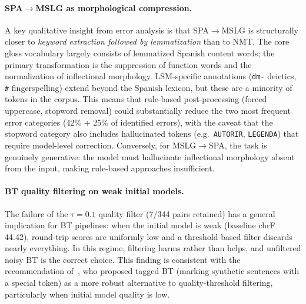 \documentclass[sigconf,screen]{ceurart}
\begin{document}
\paragraph{SPA$\!\to\!$MSLG as morphological compression.}
A key qualitative insight from error analysis is that
SPA$\!\to\!$MSLG is structurally closer to \emph{keyword extraction
followed by lemmatization} than to NMT.
The core gloss vocabulary largely consists of lemmatized Spanish
content words; the primary transformation is the suppression of
function words and the normalization of inflectional morphology.
LSM-specific annotations (\texttt{dm-} deictics, \texttt{\#}
fingerspelling) extend beyond the Spanish lexicon, but these are
a minority of tokens in the corpus.
This means that rule-based post-processing (forced uppercase, stopword
removal) could substantially reduce the two most frequent error
categories (42\% + 25\% of identified errors), with the caveat that
the stopword category also includes hallucinated tokens (e.g.\
\texttt{AUTORIR}, \texttt{LEGENDA}) that require model-level correction.
Conversely, for MSLG$\!\to\!$SPA, the task is genuinely generative:
the model must hallucinate inflectional morphology absent from the
input, making rule-based approaches insufficient.

\paragraph{BT quality filtering on weak initial models.}
The failure of the $\tau = 0.1$ quality filter (7/344 pairs retained)
has a general implication for BT pipelines: when the initial model is
weak (baseline chrF 44.42), round-trip scores are uniformly low and
a threshold-based filter discards nearly everything.
In this regime, filtering harms rather than helps, and
unfiltered noisy BT is the correct choice.
This finding is consistent with the recommendation
of~\cite{caswell2019tagged}, who proposed tagged BT (marking synthetic
sentences with a special token) as a more robust alternative to
quality-threshold filtering, particularly when initial model quality
is low.
\end{document}
